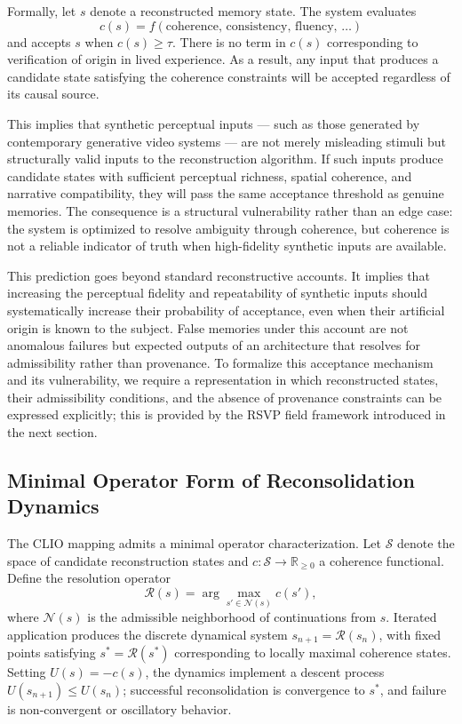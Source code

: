 \documentclass[12pt, a4paper]{article}
\begin{document}
Formally, let $s$ denote a reconstructed memory state. The system evaluates
\[
c(s) = f(\text{coherence},\, \text{consistency},\, \text{fluency},\, \dots)
\]
and accepts $s$ when $c(s) \geq \tau$. There is no term in $c(s)$ corresponding to verification of origin in lived experience. As a result, any input that produces a candidate state satisfying the coherence constraints will be accepted regardless of its causal source.

This implies that synthetic perceptual inputs --- such as those generated by contemporary generative video systems --- are not merely misleading stimuli but structurally valid inputs to the reconstruction algorithm. If such inputs produce candidate states with sufficient perceptual richness, spatial coherence, and narrative compatibility, they will pass the same acceptance threshold as genuine memories. The consequence is a structural vulnerability rather than an edge case: the system is optimized to resolve ambiguity through coherence, but coherence is not a reliable indicator of truth when high-fidelity synthetic inputs are available.

This prediction goes beyond standard reconstructive accounts. It implies that increasing the perceptual fidelity and repeatability of synthetic inputs should systematically increase their probability of acceptance, even when their artificial origin is known to the subject. False memories under this account are not anomalous failures but expected outputs of an architecture that resolves for admissibility rather than provenance. To formalize this acceptance mechanism and its vulnerability, we require a representation in which reconstructed states, their admissibility conditions, and the absence of provenance constraints can be expressed explicitly; this is provided by the RSVP field framework introduced in the next section.

\subsection{Minimal Operator Form of Reconsolidation Dynamics}

The CLIO mapping admits a minimal operator characterization. Let $\mathcal{S}$ denote the space of candidate reconstruction states and $c : \mathcal{S} \to \mathbb{R}_{\geq 0}$ a coherence functional. Define the resolution operator
\[
\mathcal{R}(s) = \arg\max_{s' \in \mathcal{N}(s)} c(s'),
\]
where $\mathcal{N}(s)$ is the admissible neighborhood of continuations from $s$. Iterated application produces the discrete dynamical system $s_{n+1} = \mathcal{R}(s_n)$, with fixed points satisfying $s^* = \mathcal{R}(s^*)$ corresponding to locally maximal coherence states. Setting $U(s) = -c(s)$, the dynamics implement a descent process $U(s_{n+1}) \leq U(s_n)$; successful reconsolidation is convergence to $s^*$, and failure is non-convergent or oscillatory behavior.
\end{document}

